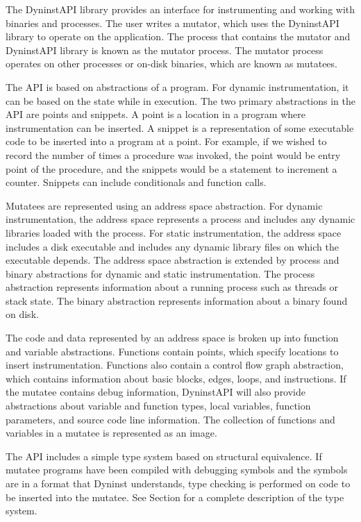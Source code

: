 The DyninstAPI library provides an interface for instrumenting and working with
binaries and processes. The user writes a mutator, which uses the DyninstAPI
library to operate on the application. The process that contains the mutator
and DyninstAPI library is known as the mutator process. The mutator process
operates on other processes or on-disk binaries, which are known as mutatees.

The API is based on abstractions of a program. For dynamic instrumentation, it
can be based on the state while in execution. The two primary abstractions in
the API are points and snippets. A point is a location in a program where
instrumentation can be inserted. A snippet is a representation of some
executable code to be inserted into a program at a point. For example, if
we wished to record the number of times a procedure was invoked, the point
would be entry point of the procedure, and the snippets would be a statement
to increment a counter. Snippets can include conditionals and function calls.

Mutatees are represented using an address space abstraction. For dynamic
instrumentation, the address space represents a process and includes any
dynamic libraries loaded with the process. For static instrumentation, the
address space includes a disk executable and includes any dynamic library
files on which the executable depends. The address space abstraction is
extended by process and binary abstractions for dynamic and static
instrumentation. The process abstraction represents information about a
running process such as threads or stack state. The binary abstraction
represents information about a binary found on disk.

The code and data represented by an address space is broken up into function
and variable abstractions. Functions contain points, which specify locations
to insert instrumentation. Functions also contain a control flow graph
abstraction, which contains information about basic blocks, edges, loops, and
instructions. If the mutatee contains debug information, DyninstAPI will also
provide abstractions about variable and function types, local variables,
function parameters, and source code line information. The collection of
functions and variables in a mutatee is represented as an image.

The API includes a simple type system based on structural equivalence. If
mutatee programs have been compiled with debugging symbols and the symbols
are in a format that Dyninst understands, type checking is performed on code
to be inserted into the mutatee. See Section for a complete description of the
type system.

